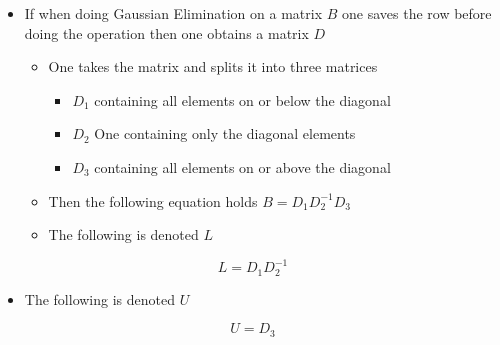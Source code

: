 \documentclass[11pt]{article}
\begin{document}
\begin{itemize}
\item If when doing Gaussian Elimination on a matrix \(B\) one saves the row before doing the operation then one obtains a matrix \(D\)
\begin{itemize}
\item One takes the matrix and splits it into three matrices
\begin{itemize}
\item \(D_1\) containing all elements on or below the diagonal
\item \(D_2\) One containing only the diagonal elements
\item \(D_3\) containing all elements on or above the diagonal
\end{itemize}
\item Then the following equation holds \(B=D_1 D_2^{-1} D_3\)
\item The following is denoted \(L\)
\end{itemize}
\end{itemize}
\begin{equation}
  L = D_1 D_2^{-1}
\end{equation}
\begin{itemize}
\item The following is denoted \(U\)
\end{itemize}
\begin{equation}
  U = D_3
\end{equation}
\end{document}
